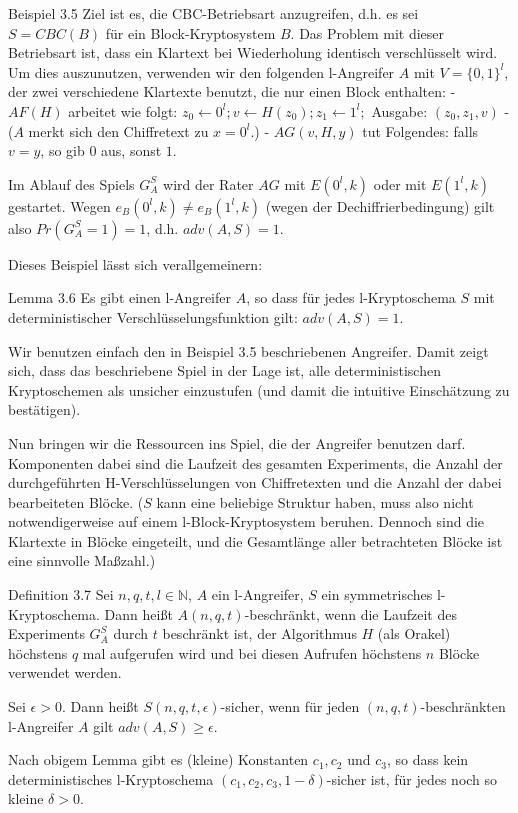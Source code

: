 \documentclass[a4paper]{article}
\begin{document}
\begin{multicols}{3}
    Beispiel 3.5 Ziel ist es, die CBC-Betriebsart anzugreifen, d.h. es sei $S=CBC(B)$ für ein Block-Kryptosystem $B$. Das Problem mit dieser Betriebsart ist, dass ein Klartext bei Wiederholung identisch verschlüsselt wird. Um dies auszunutzen, verwenden wir den folgenden l-Angreifer $A$ mit $V=\{0,1\}^l$, der zwei verschiedene Klartexte benutzt, die nur einen Block enthalten:
    - $AF(H)$ arbeitet wie folgt: $z_0\leftarrow 0^l;v\leftarrow H(z_0);z_1\leftarrow 1^l;$ Ausgabe: $(z_0,z_1,v)$
    - ($A$ merkt sich den Chiffretext zu $x=0^l$.)
    - $AG(v,H,y)$ tut Folgendes: falls $v=y$, so gib $0$ aus, sonst $1$.

    Im Ablauf des Spiels $G^S_A$ wird der Rater $AG$ mit $E(0^l,k)$ oder mit $E(1^l,k)$ gestartet. Wegen $e_B(0^l,k)\not=e_B(1^l,k)$ (wegen der Dechiffrierbedingung) gilt also $Pr(G^S_A=1)=1$, d.h. $adv(A,S)=1$.

    Dieses Beispiel lässt sich verallgemeinern:

    Lemma 3.6 Es gibt einen l-Angreifer $A$, so dass für jedes l-Kryptoschema $S$ mit deterministischer Verschlüsselungsfunktion gilt: $adv(A,S) = 1$.

    Wir benutzen einfach den in Beispiel 3.5 beschriebenen Angreifer. Damit zeigt sich, dass das beschriebene Spiel in der Lage ist, alle deterministischen Kryptoschemen als unsicher einzustufen (und damit die intuitive Einschätzung zu bestätigen).

    Nun bringen wir die Ressourcen ins Spiel, die der Angreifer benutzen darf. Komponenten dabei sind die Laufzeit des gesamten Experiments, die Anzahl der durchgeführten H-Verschlüsselungen von Chiffretexten und die Anzahl der dabei bearbeiteten Blöcke. ($S$ kann eine beliebige Struktur haben, muss also nicht notwendigerweise auf einem l-Block-Kryptosystem beruhen. Dennoch sind die Klartexte in Blöcke eingeteilt, und die Gesamtlänge aller betrachteten Blöcke ist eine sinnvolle Maßzahl.)

    Definition 3.7 Sei $n,q,t,l\in\mathbb{N}$, $A$ ein l-Angreifer, $S$ ein symmetrisches l-Kryptoschema. Dann heißt $A(n,q,t)$-beschränkt, wenn die Laufzeit des Experiments $G^S_A$ durch $t$ beschränkt ist, der Algorithmus $H$ (als Orakel) höchstens $q$ mal aufgerufen wird und bei diesen Aufrufen höchstens $n$ Blöcke verwendet werden.

    Sei $\epsilon> 0$. Dann heißt $S(n,q,t,\epsilon)$-sicher, wenn für jeden $(n,q,t)$-beschränkten l-Angreifer $A$ gilt $adv(A,S)\geq\epsilon$.

    Nach obigem Lemma gibt es (kleine) Konstanten $c_1,c_2$ und $c_3$, so dass kein deterministisches l-Kryptoschema $(c_1,c_2,c_3,1-\delta)$-sicher ist, für jedes noch so kleine $\delta > 0$.


\end{multicols}
\end{document}
